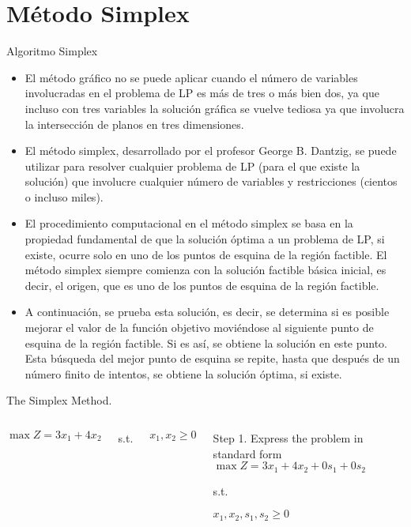 
\section{Método Simplex}
\label{sec:simplex-method}


\begin{frame}{Algoritmo Simplex}
  \begin{itemize} \parskip3mm \justifying
  \item<only@1>   El método gráfico no se puede aplicar cuando el número de variables involucradas en el problema de LP es más de tres o más bien dos, ya que incluso \alert{con tres variables la solución gráfica se vuelve tediosa} ya que involucra la intersección de planos en tres dimensiones.

  \item<only@1>   El método simplex, desarrollado por el profesor George B. Dantzig, se puede utilizar para resolver cualquier problema de LP (para el que existe la solución) que involucre cualquier número de variables y restricciones (cientos o incluso miles).
  
  \item<only@2>   El procedimiento computacional en el método simplex \alert{se basa en la propiedad fundamental de que la solución óptima a un problema de LP, si existe, ocurre solo en uno de los puntos de esquina de la región factible.} El método simplex siempre comienza con la solución factible básica inicial, es decir, el origen, que es uno de los puntos de esquina de la región factible.

  \item<only@2>   A continuación, se prueba esta solución, es decir, \alert{se determina si es posible mejorar el valor de la función objetivo moviéndose al siguiente punto de esquina de la región factible.} Si es así, se obtiene la solución en este punto. Esta búsqueda del mejor punto de esquina se repite, hasta que después de un número finito de intentos, se obtiene la solución óptima, si existe.
  \end{itemize}
\end{frame}

\begin{frameExample}{The Simplex Method.}{}
  \begin{columns}
    $\max Z = 3x_1 + 4x_2 $

  s.t.

$    x_1, x_2  \geq 0$

\begin{block}{Step 1. Express the problem in standard form}\justifying 
    $\max Z = 3x_1 + 4x_2 + 0s_1 + 0s_2$

  s.t.

$    x_1, x_2, s_1, s_2  \geq 0$
\end{block}
  \end{columns}
\end{frameExample}

